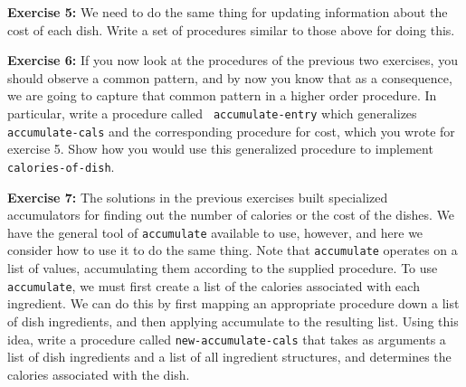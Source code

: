 \vskip 20pt

{\bf Exercise 5:}  We need to do the same thing for updating information
about the cost of each dish.  Write a set of procedures similar to those
above for doing this.

\vskip 20pt

{\bf Exercise 6:}
If you now look at the procedures of the previous two exercises, you
should observe a common pattern, and by now you know that as a
consequence, we are going to capture that common pattern in a higher
order procedure.  In particular, write a procedure called {\tt
accumulate-entry} which generalizes {\tt accumulate-cals} and the
corresponding procedure for cost, which you wrote for exercise 5.
Show how you would use this generalized procedure to implement {\tt
calories-of-dish}.


\vskip 20pt

{\bf Exercise 7:}  The solutions in the previous exercises built
specialized accumulators for finding out the number of calories or the
cost of the dishes.  We have the general tool of {\tt accumulate}
available to use, however, and here we consider how to use it to do
the same thing.  Note that {\tt accumulate} operates on a list of
values, accumulating them according to the supplied procedure.  To use
{\tt accumulate}, we must first create a list of the calories
associated with each ingredient.  We can do this by first mapping an
appropriate procedure down a list of dish ingredients, and then
applying accumulate to the resulting list.  Using this idea, write a
procedure called {\tt new-accumulate-cals} that takes as arguments a
list of dish ingredients and a list of all ingredient structures, and
determines the calories associated with the dish.



